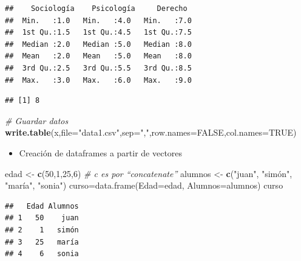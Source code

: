 \documentclass[]{article}
\newenvironment{Shaded}{\begin{snugshade}}{\end{snugshade}}
\newcommand{\CommentTok}[1]{\textcolor[rgb]{0.56,0.35,0.01}{\textit{#1}}}
\newcommand{\DataTypeTok}[1]{\textcolor[rgb]{0.13,0.29,0.53}{#1}}
\newcommand{\DecValTok}[1]{\textcolor[rgb]{0.00,0.00,0.81}{#1}}
\newcommand{\KeywordTok}[1]{\textcolor[rgb]{0.13,0.29,0.53}{\textbf{#1}}}
\newcommand{\NormalTok}[1]{#1}
\newcommand{\OperatorTok}[1]{\textcolor[rgb]{0.81,0.36,0.00}{\textbf{#1}}}
\newcommand{\OtherTok}[1]{\textcolor[rgb]{0.56,0.35,0.01}{#1}}
\newcommand{\StringTok}[1]{\textcolor[rgb]{0.31,0.60,0.02}{#1}}
\providecommand{\tightlist}{%
  \setlength{\itemsep}{0pt}\setlength{\parskip}{0pt}}
\begin{document}
\begin{verbatim}
##    Sociología    Psicología     Derecho   
##  Min.   :1.0   Min.   :4.0   Min.   :7.0  
##  1st Qu.:1.5   1st Qu.:4.5   1st Qu.:7.5  
##  Median :2.0   Median :5.0   Median :8.0  
##  Mean   :2.0   Mean   :5.0   Mean   :8.0  
##  3rd Qu.:2.5   3rd Qu.:5.5   3rd Qu.:8.5  
##  Max.   :3.0   Max.   :6.0   Max.   :9.0
\end{verbatim}

\begin{Shaded}
\end{Shaded}

\begin{verbatim}
## [1] 8
\end{verbatim}

\begin{Shaded}
\begin{Highlighting}[]
\CommentTok{# Guardar datos}
\KeywordTok{write.table}\NormalTok{(x,}\DataTypeTok{file=}\StringTok{"data1.csv"}\NormalTok{,}\DataTypeTok{sep=}\StringTok{","}\NormalTok{,}\DataTypeTok{row.names=}\OtherTok{FALSE}\NormalTok{,}\DataTypeTok{col.names=}\OtherTok{TRUE}\NormalTok{)}
\end{Highlighting}
\end{Shaded}

\begin{itemize}
\tightlist
\item
  Creación de dataframes a partir de vectores
\end{itemize}

\begin{Shaded}
\begin{Highlighting}[]
\NormalTok{edad <-}\StringTok{ }\KeywordTok{c}\NormalTok{(}\DecValTok{50}\NormalTok{,}\DecValTok{1}\NormalTok{,}\DecValTok{25}\NormalTok{,}\DecValTok{6}\NormalTok{) }\CommentTok{# c es por “concatenate”}
\NormalTok{alumnos <-}\StringTok{ }\KeywordTok{c}\NormalTok{(}\StringTok{"juan"}\NormalTok{, }\StringTok{"simón", "}\NormalTok{maría}\StringTok{", "}\NormalTok{sonia}\StringTok{")}
\StringTok{curso=data.frame(Edad=edad, Alumnos=alumnos)}
\StringTok{curso}
\end{Highlighting}
\end{Shaded}

\begin{verbatim}
##   Edad Alumnos
## 1   50    juan
## 2    1   simón
## 3   25   maría
## 4    6   sonia
\end{verbatim}
\end{document}
